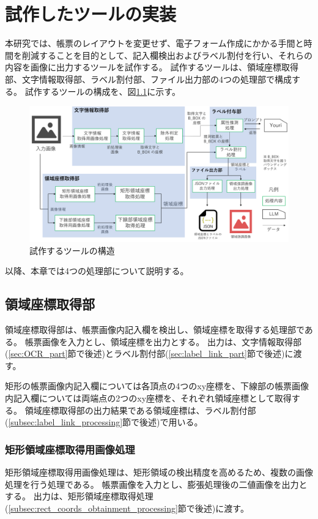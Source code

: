 \chapter{試作したツールの実装}\label{cha:Implementation}
本研究では、帳票のレイアウトを変更せず、電子フォーム作成にかかる手間と時間を削減することを目的として、記入欄検出およびラベル割付を行い、それらの内容を画像に出力するツールを試作する。
試作するツールは、領域座標取得部、文字情報取得部、ラベル割付部、ファイル出力部の4つの処理部で構成する。
試作するツールの構成を、図\ref{fig:structure}に示す。

\begin{figure}[tp]
    \begin{center}
        \includegraphics[width=15cm]{image/04-implementation/structure.png}
        \caption{試作するツールの構造}
        \label{fig:structure}
    \end{center}
\end{figure}

以降、本章では4つの処理部について説明する。


\section{領域座標取得部}\label{sec:area_coords_obtainment_part}
領域座標取得部は、帳票画像内記入欄を検出し、領域座標を取得する処理部である。
帳票画像を入力とし、領域座標を出力とする。
出力は、文字情報取得部(\ref{sec:OCR_part}節で後述)とラベル割付部(\ref{sec:label_link_part}節で後述)に渡す。

矩形の帳票画像内記入欄については各頂点の4つのxy座標を、下線部の帳票画像内記入欄については両端点の2つのxy座標を、それぞれ領域座標として取得する。
領域座標取得部の出力結果である領域座標は、ラベル割付部(\ref{subsec:label_link_processing}節で後述)で用いる。

\subsection{矩形領域座標取得用画像処理}\label{subsec:image_processing_for_rect_coords_obtainment}
矩形領域座標取得用画像処理は、矩形領域の検出精度を高めるため、複数の画像処理を行う処理である。
帳票画像を入力とし、膨張処理後の二値画像を出力とする。
出力は、矩形領域座標取得処理(\ref{subsec:rect_coords_obtainment_processing}節で後述)に渡す。

